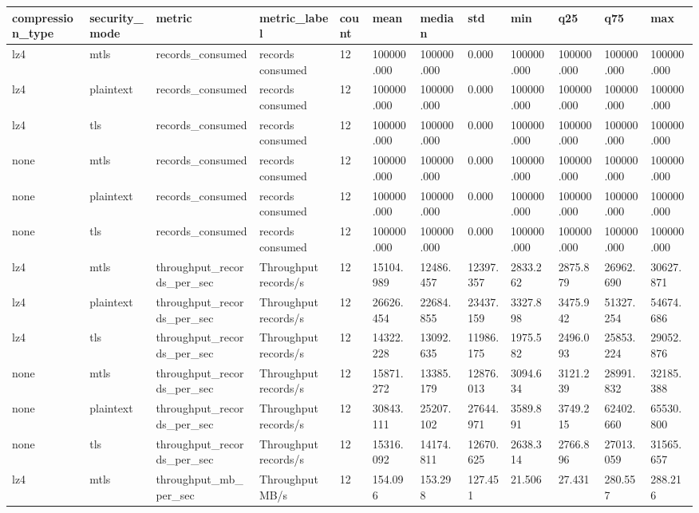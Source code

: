 \begin{longtable}{llllllllllll}
\hline
compression\_type & security\_mode & metric & metric\_label & count & mean & median & std & min & q25 & q75 & max \\
\hline
lz4 & mtls & records\_consumed & records consumed & 12 & 100000.000 & 100000.000 & 0.000 & 100000.000 & 100000.000 & 100000.000 & 100000.000 \\
lz4 & plaintext & records\_consumed & records consumed & 12 & 100000.000 & 100000.000 & 0.000 & 100000.000 & 100000.000 & 100000.000 & 100000.000 \\
lz4 & tls & records\_consumed & records consumed & 12 & 100000.000 & 100000.000 & 0.000 & 100000.000 & 100000.000 & 100000.000 & 100000.000 \\
none & mtls & records\_consumed & records consumed & 12 & 100000.000 & 100000.000 & 0.000 & 100000.000 & 100000.000 & 100000.000 & 100000.000 \\
none & plaintext & records\_consumed & records consumed & 12 & 100000.000 & 100000.000 & 0.000 & 100000.000 & 100000.000 & 100000.000 & 100000.000 \\
none & tls & records\_consumed & records consumed & 12 & 100000.000 & 100000.000 & 0.000 & 100000.000 & 100000.000 & 100000.000 & 100000.000 \\
lz4 & mtls & throughput\_records\_per\_sec & Throughput records/s & 12 & 15104.989 & 12486.457 & 12397.357 & 2833.262 & 2875.879 & 26962.690 & 30627.871 \\
lz4 & plaintext & throughput\_records\_per\_sec & Throughput records/s & 12 & 26626.454 & 22684.855 & 23437.159 & 3327.898 & 3475.942 & 51327.254 & 54674.686 \\
lz4 & tls & throughput\_records\_per\_sec & Throughput records/s & 12 & 14322.228 & 13092.635 & 11986.175 & 1975.582 & 2496.093 & 25853.224 & 29052.876 \\
none & mtls & throughput\_records\_per\_sec & Throughput records/s & 12 & 15871.272 & 13385.179 & 12876.013 & 3094.634 & 3121.239 & 28991.832 & 32185.388 \\
none & plaintext & throughput\_records\_per\_sec & Throughput records/s & 12 & 30843.111 & 25207.102 & 27644.971 & 3589.891 & 3749.215 & 62402.660 & 65530.800 \\
none & tls & throughput\_records\_per\_sec & Throughput records/s & 12 & 15316.092 & 14174.811 & 12670.625 & 2638.314 & 2766.896 & 27013.059 & 31565.657 \\
lz4 & mtls & throughput\_mb\_per\_sec & Throughput MB/s & 12 & 154.096 & 153.298 & 127.451 & 21.506 & 27.431 & 280.557 & 288.216 \\

\end{longtable}
